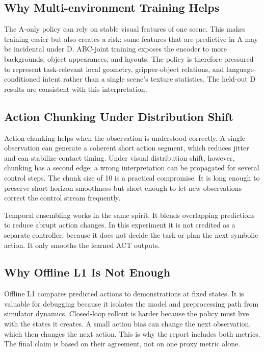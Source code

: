 \documentclass[10pt,twocolumn]{article}
\begin{document}
\subsection{Why Multi-environment Training Helps}

The A-only policy can rely on stable visual features of one scene. This makes training easier but also creates a risk: some features that are predictive in A may be incidental under D. ABC-joint training exposes the encoder to more backgrounds, object appearances, and layouts. The policy is therefore pressured to represent task-relevant local geometry, gripper-object relations, and language-conditioned intent rather than a single scene's texture statistics. The held-out D results are consistent with this interpretation.

\subsection{Action Chunking Under Distribution Shift}

Action chunking helps when the observation is understood correctly. A single observation can generate a coherent short action segment, which reduces jitter and can stabilize contact timing. Under visual distribution shift, however, chunking has a second edge: a wrong interpretation can be propagated for several control steps. The chunk size of 10 is a practical compromise. It is long enough to preserve short-horizon smoothness but short enough to let new observations correct the control stream frequently.

Temporal ensembling works in the same spirit. It blends overlapping predictions to reduce abrupt action changes. In this experiment it is not credited as a separate controller, because it does not decide the task or plan the next symbolic action. It only smooths the learned ACT outputs.

\subsection{Why Offline L1 Is Not Enough}

Offline L1 compares predicted actions to demonstrations at fixed states. It is valuable for debugging because it isolates the model and preprocessing path from simulator dynamics. Closed-loop rollout is harder because the policy must live with the states it creates. A small action bias can change the next observation, which then changes the next action. This is why the report includes both metrics. The final claim is based on their agreement, not on one proxy metric alone.
\end{document}
